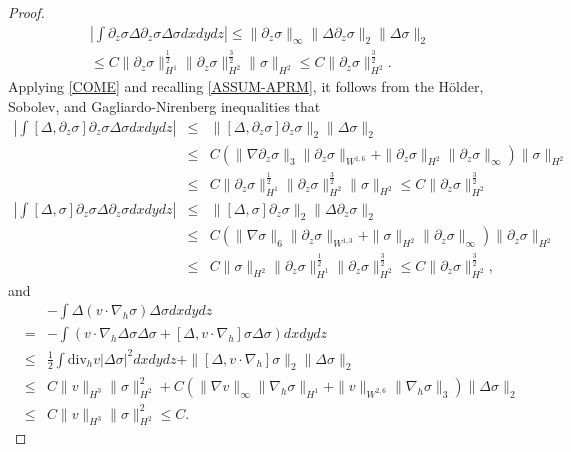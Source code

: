 \documentclass[10pt,a4paper]{amsart}
\begin{document}
\begin{proof}
\begin{eqnarray}
\left|\int\partial_z\sigma\Delta\partial_z\sigma\Delta\sigma dxdydz\right|\leq \|\partial_z\sigma\|_\infty\|\Delta\partial_z\sigma\|_2\|\Delta
\sigma\|_2\nonumber\\
\leq C\|\partial_z\sigma\|_{H^1}^\frac12\|\partial_z\sigma\|_{H^2}^\frac32\|\sigma\|_{H^2}\leq C\|\partial_z\sigma\|_{H^2}^\frac32.\label{EQ26}
\end{eqnarray}
Applying \eqref{COME} and recalling \eqref{ASSUM-APRM}, it follows from the H\"older, Sobolev, and Gagliardo-Nirenberg inequalities that
\begin{eqnarray}
  \left|\int[\Delta,\partial_z\sigma]\partial_z\sigma\Delta\sigma dxdydz\right|
  &\leq&\|[\Delta,\partial_z\sigma]\partial_z\sigma\|_2\|\Delta\sigma\|_2\nonumber\\
  &\leq& C(\|\nabla\partial_z\sigma\|_3\|\partial_z\sigma\|_{W^{1,6}}
  +\|\partial_z\sigma\|_{H^2}\|\partial_z\sigma\|_\infty)\|\sigma\|_{H^2}\nonumber\\
  &\leq& C\|\partial_z\sigma\|_{H^1}^\frac12\|\partial_z\sigma\|_{H^2}^\frac32\|\sigma\|_{H^2}\leq C\|\partial_z\sigma\|_{H^2}^\frac32
  \label{EQ27}\\
  \left|\int[\Delta,\sigma]\partial_z\sigma\Delta\partial_z\sigma dxdydz\right|&\leq&\|[\Delta,\sigma]\partial_z\sigma\|_2\|\Delta\partial_z
  \sigma\|_2\nonumber\\
  &\leq&C(\|\nabla\sigma\|_6\|\partial_z\sigma\|_{W^{1,3}}+\|\sigma\|_{H^2}\|\partial_z\sigma\|_\infty)\|\partial_z\sigma\|_{H^2}\nonumber\\
  &\leq&C\|\sigma\|_{H^2}\|\partial_z\sigma\|_{H^1}^\frac12\|\partial_z\sigma\|_{H^2}^\frac32\leq C\|\partial_z\sigma\|_{H^2}^\frac32,
  \label{EQ28}
\end{eqnarray}
and
\begin{eqnarray}
  &&-\int\Delta(v\cdot\nabla_h\sigma)\Delta\sigma dxdydz\nonumber\\
  &=&-\int(v\cdot\nabla_h\Delta\sigma\Delta\sigma+[\Delta,v\cdot\nabla_h]\sigma\Delta\sigma)dxdydz\nonumber\\
  &\leq&\frac12\int\text{div}_hv|\Delta\sigma|^2dxdydz +\|[\Delta,v\cdot\nabla_h]\sigma\|_2\|\Delta\sigma\|_2\nonumber\\
  &\leq&C\|v\|_{H^3}\|\sigma\|_{H^2}^2+C(\|\nabla v\|_\infty\|\nabla_h\sigma\|_{H^1}+\|v\|_{W^{2,6}}\|\nabla_h\sigma\|_3)
  \|\Delta\sigma\|_2\nonumber\\
  &\leq&C\|v\|_{H^3}\|\sigma\|_{H^2}^2\leq C.\label{EQ29}
\end{eqnarray}

\end{proof}
\end{document}
